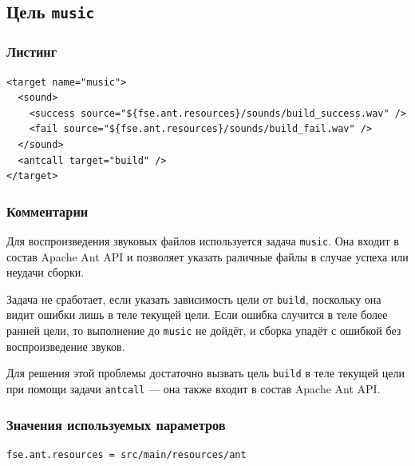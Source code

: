 \subsection{Цель \texttt{music}}

\subsubsection{Листинг}

\begin{lstlisting}[caption={Часть содержимого файла \texttt{build.xml}},captionpos=b]
<target name="music">
  <sound>
    <success source="${fse.ant.resources}/sounds/build_success.wav" />
    <fail source="${fse.ant.resources}/sounds/build_fail.wav" />
  </sound>
  <antcall target="build" />
</target>
\end{lstlisting}

\subsubsection{Комментарии}

Для воспроизведения звуковых файлов используется задача \texttt{music}. Она входит в состав Apache Ant API и позволяет указать раличные файлы в случае успеха или неудачи сборки.

Задача не сработает, если указать зависимость цели от \texttt{build}, поскольку она видит ошибки лишь в теле текущей цели. Если ошибка случится в теле более ранней цели, то выполнение до \texttt{music} не дойдёт, и сборка упадёт с ошибкой без воспроизведение звуков.

Для решения этой проблемы достаточно вызвать цель \texttt{build} в теле текущей цели при помощи задачи \texttt{antcall} --- она также входит в состав Apache Ant API.

\subsubsection{Значения используемых параметров}

\begin{lstlisting}[language=Properties,caption={Часть содержимого файла \texttt{build.properties}},captionpos=b]
fse.ant.resources = src/main/resources/ant
\end{lstlisting}
